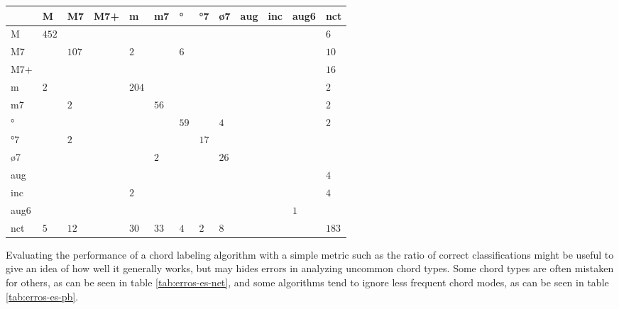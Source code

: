 \documentclass{article}
\begin{document}
\begin{table*}
\centering
\begin{tabular}{l|p{0.55cm}|p{0.55cm}|p{0.55cm}|p{0.55cm}|p{0.55cm}|p{0.55cm}|p{0.55cm}|p{0.55cm}|p{0.55cm}|p{0.55cm}|p{0.55cm}|p{0.55cm}}
      &     M &    M7 &   M7+ &     m &    m7 &    ° &   °7 &   ø7 &   aug &   inc &  aug6 &   nct  \\  \hline
    M & $ 452 $& $ $& $ $& $ $& $ $& $ $& $ $& $ $& $ $& $ $& $ $& $   6 $ \\ \hline
   M7 & $ $& $ 107 $& $ $& $   2 $& $ $& $   6 $& $ $& $ $& $ $& $ $& $ $& $  10 $ \\ \hline
  M7+ & $ $& $ $& $ $& $ $& $ $& $ $& $ $& $ $& $ $& $ $& $ $& $  16 $ \\ \hline
    m & $   2 $& $ $& $ $& $ 204 $& $ $& $ $& $ $& $ $& $ $& $ $& $ $& $   2 $ \\ \hline
   m7 & $ $& $   2 $& $ $& $ $& $  56 $& $ $& $ $& $ $& $ $& $ $& $ $& $   2 $ \\ \hline
    ° & $ $& $ $& $ $& $ $& $ $& $  59 $& $ $& $   4 $& $ $& $ $& $ $& $   2 $ \\ \hline
   °7 & $ $& $   2 $& $ $& $ $& $ $& $ $& $  17 $& $ $& $ $& $ $& $ $& $ $ \\ \hline
   ø7 & $ $& $ $& $ $& $ $& $   2 $& $ $& $ $& $  26 $& $ $& $ $& $ $& $ $ \\ \hline
  aug & $ $& $ $& $ $& $ $& $ $& $ $& $ $& $ $& $ $& $ $& $ $& $   4 $ \\ \hline
  inc & $ $& $ $& $ $& $   2 $& $ $& $ $& $ $& $ $& $ $& $ $& $ $& $   4 $ \\ \hline
 aug6 & $ $& $ $& $ $& $ $& $ $& $ $& $ $& $ $& $ $& $ $& $   1 $& $ $ \\ \hline
  nct & $   5 $& $  12 $& $ $& $  30 $& $  33 $& $   4 $& $   2 $& $   8 $& $ $& $ $& $ $& $ 183 $ \\ \hline
\end{tabular}


\caption{Classifications made by our best algorithm, \texttt{ES-net}. The rows represent
  the expected answers while the columns are the returned
  results. Note that the matrix is not symmetric.}
\label{tab:erros-es-net}
\end{table*}



Evaluating the performance of a chord labeling algorithm with a simple
metric such as the ratio of correct classifications might be useful to
give an idea of how well it generally works, but may hides errors in
analyzing uncommon chord types. Some chord types are often mistaken
for others, as can be seen in table \ref{tab:erros-es-net}, and some
algorithms tend to ignore less frequent chord modes, as can be seen in
table \ref{tab:erros-es-pb}.
\end{document}
